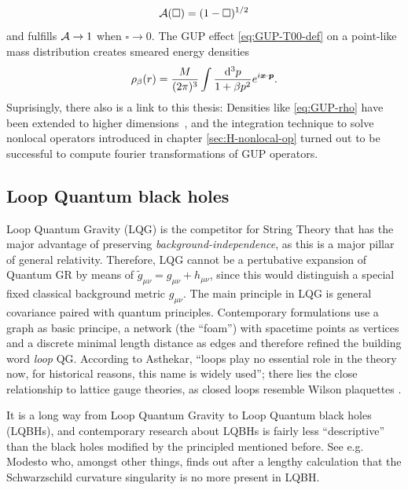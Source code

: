 \documentclass[12pt,a4paper]{report}
\numberwithin{equation}{chapter}
\begin{document}
\begin{appendices}
\begin{equation}
{\cal A}(\square) = (1 - \square)^{1/2}
\end{equation}
and fulfills ${\cal A}\to 1$ when $\square\to 0$. The GUP effect \eqref{eq:GUP-T00-def} on a point-like mass distribution creates smeared energy densities \cite{Isi1, Isi2}
\begin{equation}\label{eq:GUP-rho}
\rho_\beta(r) = \frac{M}{(2\pi)^3} \int \frac{\mathrm{d}^3 p}{1 + \beta p^2} e^{i \boldsymbol{ x } \cdot \boldsymbol{ p }}.
\end{equation}
Suprisingly, there also is a link to this thesis: Densities like \eqref{eq:GUP-rho} have been extended to higher dimensions~\cite{Knipfer2014,GUPpaedagogical,Dirkes2013}, and the integration technique to solve nonlocal operators introduced in chapter \ref{sec:H-nonlocal-op} turned out to be successful to compute fourier transformations of GUP operators.


\subsection{Loop Quantum black holes}
Loop Quantum Gravity (LQG) is the competitor for String Theory that has the major advantage of preserving \emph{background-independence}, as this is a major pillar of general relativity. Therefore, LQG cannot be a pertubative expansion of Quantum GR by means of $\tilde g_{\mu\nu} = g_{\mu\nu} + h_{\mu\nu}$, since this would distinguish a special fixed classical background metric $g_{\mu\nu}$. The main principle in LQG is general covariance paired with quantum principles. Contemporary formulations use a graph as basic principe, a network (the ``foam'') with spacetime points as vertices and a discrete minimal length distance as edges and therefore refined the building word \emph{loop} QG. According to Asthekar, ``loops play no essential role in the theory now, for historical reasons, this name is widely used''; there lies the close relationship to lattice gauge theories, as closed loops resemble Wilson plaquettes \cite{WagnerQFT, loopQG-review}.

It is a long way from Loop Quantum Gravity to Loop Quantum black holes (LQBHs), and contemporary research about LQBHs is fairly less ``descriptive'' than the black holes modified by the principled mentioned before. See e.g. Modesto \cite{Modesto:2005zm} who, amongst other things, finds out after a lengthy calculation that the Schwarzschild curvature singularity is no more present in LQBH.


\end{appendices}
\end{document}
